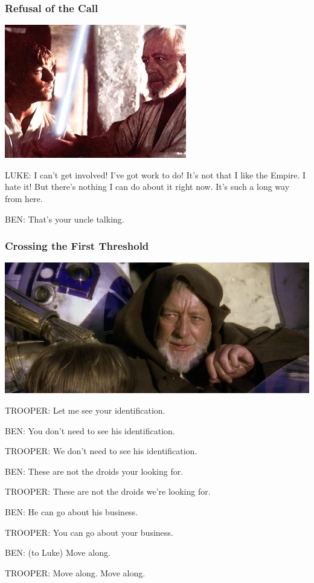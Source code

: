 \documentclass{beamer}
\newcommand{\bs}{\bigskip}
\begin{document}
\begin{frame}\frametitle{Refusal of the Call}

\includegraphics[scale=.5]{star_wars_luke_ben.jpg}

\bs

LUKE: I can't get involved! I've got work to do! It's not that I like
the Empire. I hate it! But there's nothing I can do about it right
now. It's such a long way from here.

\bs

BEN: That's your uncle talking.



\end{frame}
\begin{frame}\frametitle{Crossing the First Threshold}

\includegraphics[scale=0.3]{mindtrick.jpg}

TROOPER: Let me see your identification.

BEN: You don't need to see his identification.



TROOPER: We don't need to see his identification.



BEN: These are not the droids your looking for.



TROOPER: These are not the droids we're looking for.

BEN: He can go about his business.

TROOPER: You can go about your business.

BEN: (to Luke) Move along.

TROOPER: Move along. Move along.


\end{frame}
\end{document}

